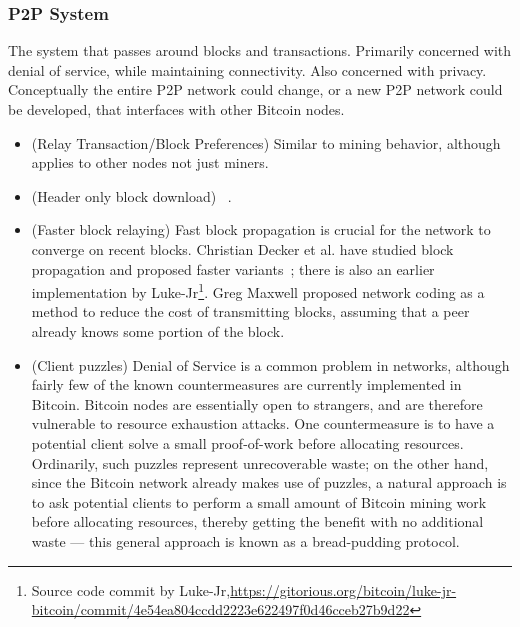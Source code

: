 \subsubsection{P2P System}
The system that passes around blocks and transactions. Primarily concerned with denial of service, while maintaining connectivity. Also concerned with privacy. Conceptually the entire P2P network could change, or a new P2P network could be developed, that interfaces with other Bitcoin nodes.
\begin{itemize}
\item (Relay Transaction/Block Preferences) Similar to mining behavior, although applies to other nodes not just miners.
\item (Header only block download) ~\cite{headerssync}.
\item (Faster block relaying) Fast block propagation is crucial for the network to converge on recent blocks. Christian Decker et al. have studied block propagation and proposed faster variants~\cite{decker2013information}; there is also an earlier implementation by Luke-Jr\footnote{Source code commit by Luke-Jr,\url{https://gitorious.org/bitcoin/luke-jr-bitcoin/commit/4e54ea804ccdd2223e622497f0d46cceb27b9d22}}. Greg Maxwell proposed network coding as a method to reduce the cost of transmitting blocks, assuming that a peer already knows some portion of the block.~\cite{blocknetworkcoding}
\item (Client puzzles) Denial of Service is a common problem in networks, although fairly few of the known countermeasures are currently implemented in Bitcoin. Bitcoin nodes are essentially open to strangers, and are therefore vulnerable to resource exhaustion attacks. One countermeasure is to have a potential client solve a small proof-of-work before allocating resources. Ordinarily, such puzzles represent unrecoverable waste; on the other hand, since the Bitcoin network already makes use of puzzles, a natural approach is to ask potential clients to perform a small amount of Bitcoin mining work before allocating resources, thereby getting the benefit with no additional waste --- this general approach is known as a bread-pudding protocol.~\cite{breadpudding}
\end{itemize}

